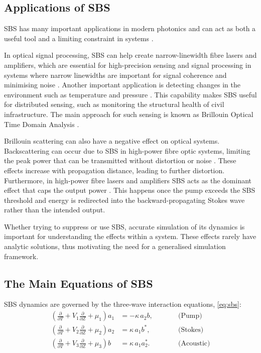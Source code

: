 \subsection{Applications of SBS}

SBS has many important applications in modern photonics and can act as both a useful tool and a limiting constraint in systems 
\parencite{baiStimulatedBrillouinScattering2018}.

In optical signal processing, SBS can help create narrow-linewidth fibre lasers and amplifiers, which are essential for 
high-precision sensing and signal processing in systems where narrow linewidths are important for signal coherence and 
minimising noise \parencite{agrawalNonlinearFiberOptics2019}. Another important application is detecting changes in the 
environment such as temperature and pressure \parencite{thevenazDistributedOpticalFiber2025}. This capability makes SBS useful for distributed sensing, such as monitoring the 
structural health of civil infrastructure. The main approach for such sensing is known as Brillouin Optical Time Domain Analysis \parencite{peledFastBrillouinOptical2012}.

Brillouin scattering can also have a negative effect on optical systems. 
Backscattering can occur due to SBS in high-power fibre optic systems, limiting the peak power that can be transmitted without 
distortion or noise \parencite{internationaltelecommunicationunionApplicationRelatedAspects2011}. These effects increase with propagation distance, leading to further distortion. Furthermore, in high-power 
fibre lasers and amplifiers SBS acts as the dominant effect that caps the output power \parencite{huangFiberbasedTechniquesSuppress2023}. This happens once the pump exceeds the SBS 
threshold and energy is redirected into the backward-propagating Stokes wave rather than the intended output.

Whether trying to suppress or use SBS, accurate simulation of its dynamics is important for understanding the effects 
within a system. These effects rarely have analytic solutions, thus motivating the need for a generalised simulation framework.

\subsection{The Main Equations of SBS}

SBS dynamics are governed by the three-wave interaction equations, \cref{eq:sbs}:
\begin{subequations}
\label{eq:sbs}
\begin{alignat}{2}
  \left(\frac{\partial}{\partial T} + V_1\frac{\partial}{\partial Z} + \mu_1\right) a_1 &= -\kappa\, a_2 b,  &\qquad& \text{(Pump)} \label{eq:pump}\\
  \left(\frac{\partial}{\partial T} + V_2\frac{\partial}{\partial Z} + \mu_2\right) a_2 &= \kappa\, a_1 b^*, && \text{(Stokes)} \label{eq:stokes}\\
  \left(\frac{\partial}{\partial T} + V_3\frac{\partial}{\partial Z} + \mu_3\right) b   &= \kappa\, a_1 a_2^*. && \text{(Acoustic)} \label{eq:acoustic}
\end{alignat}
\end{subequations}

